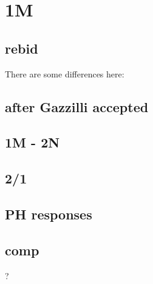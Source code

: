 \section{1M}


\subsection{rebid}


There are some differences here:

\subsection{after Gazzilli accepted}


\subsection{1M - 2N}


\subsection{2/1}


\subsection{PH responses}


\subsection{comp}

?

